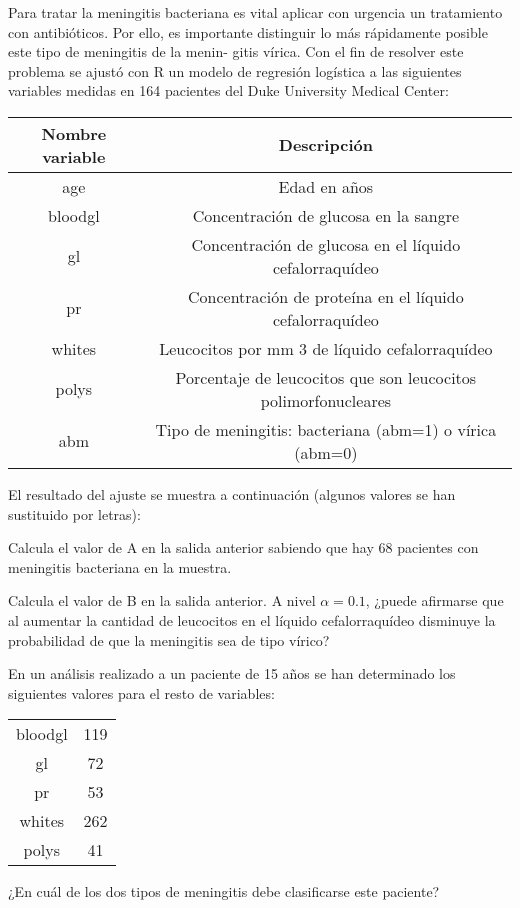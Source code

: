 \begin{problem}[5]
Para tratar la meningitis bacteriana es vital aplicar con urgencia un tratamiento con antibióticos.
Por ello, es importante distinguir lo más rápidamente posible este tipo de meningitis de la menin-
gitis vírica. Con el fin de resolver este problema se ajustó con R un modelo de regresión logística a
las siguientes variables medidas en 164 pacientes del Duke University Medical Center:

\begin{center}
\begin{tabular}{cc}
Nombre variable & Descripción\\\hline
age & Edad en años \\
bloodgl & Concentración de glucosa en la sangre \\
gl & Concentración de glucosa en el líquido cefalorraquídeo \\
pr & Concentración de proteína en el líquido cefalorraquídeo \\
whites & Leucocitos por mm 3 de líquido cefalorraquídeo \\
polys & Porcentaje de leucocitos que son leucocitos polimorfonucleares \\
abm & Tipo de meningitis: bacteriana (abm=1) o vírica (abm=0) 
\end{tabular}
\end{center}


El resultado del ajuste se muestra a continuación (algunos valores se han sustituido por letras):



\ppart Calcula el valor de A en la salida anterior sabiendo que hay 68 pacientes con meningitis
bacteriana en la muestra.

\ppart Calcula el valor de B en la salida anterior. A nivel $α = 0.1$, ¿puede afirmarse que al aumentar la
cantidad de leucocitos en el líquido cefalorraquídeo disminuye la probabilidad de que la meningitis
sea de tipo vírico?

\ppart En un análisis realizado a un paciente de 15 años se han determinado los siguientes valores para
el resto de variables:
\begin{tabular}{cc}
bloodgl&119\\
gl&72\\
pr&53\\
whites&262\\
polys&41
\end{tabular}

¿En cuál de los dos tipos de meningitis debe clasificarse este paciente?


\end{problem}
